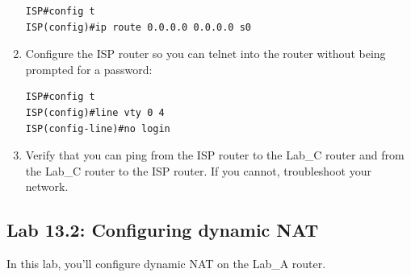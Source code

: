 \documentclass[b5paper,11pt]{memoir}
\begin{document}
\begin{enumerate}
\begin{verbatim}
ISP#config t
ISP(config)#ip route 0.0.0.0 0.0.0.0 s0
\end{verbatim}
\item
  Configure the ISP router so you can telnet into the router without
  being prompted for a password:

\begin{verbatim}
ISP#config t
ISP(config)#line vty 0 4
ISP(config-line)#no login
\end{verbatim}
\item
  Verify that you can ping from the ISP router to the Lab\_C router and
  from the Lab\_C router to the ISP router. If you cannot, troubleshoot
  your network.
\end{enumerate}




\subsection{Lab 13.2: Configuring dynamic NAT}

In this lab, you'll configure dynamic NAT on the Lab\_A router.
\end{document}

